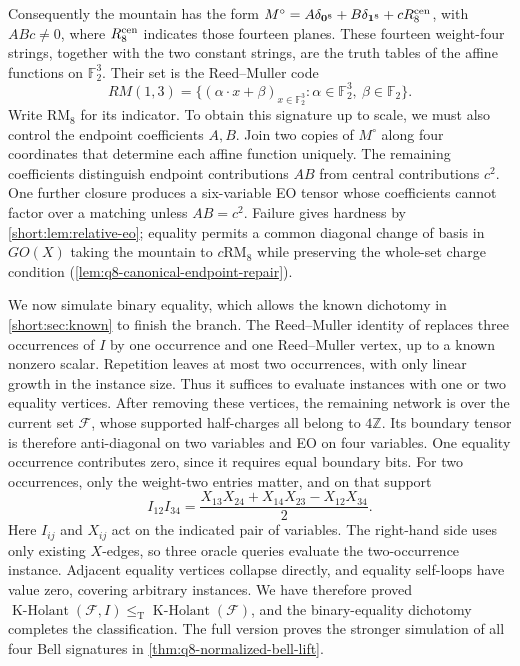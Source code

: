 \documentclass[11pt,letterpaper,onecolumn]{article}
\theoremstyle{plain}
\theoremstyle{definition}
\theoremstyle{remark}
\newcommand{\cF}{\mathcal F}
\newcommand{\KHolant}{\operatorname{K\text{-}Holant}}
\newcommand{\one}{\mathbf 1}
\newcommand{\zero}{\mathbf 0}
\newcommand{\RMcore}{\mathrm{RM}_8}
\newcommand{\leT}{\leq_{\mathrm T}}
\begin{document}
Consequently the mountain has the form
\(M^\circ=A\delta_{\zero^8}+B\delta_{\one^8}+cR_8^{\rm cen}\), with
\(ABc\ne0\), where \(R_8^{\rm cen}\) indicates those fourteen planes.
These fourteen weight-four strings, together with the two constant
strings, are the truth tables of the affine functions on \(\mathbb F_2^3\).
Their set is the Reed--Muller code
\[
RM(1,3)=\{(\alpha\cdot x+\beta)_{x\in\mathbb F_2^3}:
\alpha\in\mathbb F_2^3,\ \beta\in\mathbb F_2\}.
\]
Write \(\RMcore\) for its indicator. To obtain this signature up to
scale, we must also control the endpoint coefficients \(A,B\).
Join two copies of \(M^\circ\) along four coordinates that determine
each affine function uniquely. The remaining coefficients distinguish
endpoint contributions \(AB\) from central contributions \(c^2\).
One further closure produces a six-variable EO tensor whose coefficients
cannot factor over a matching unless \(AB=c^2\). Failure gives hardness
by \cref{short:lem:relative-eo}; equality permits a common diagonal
change of basis in \(GO(X)\) taking the mountain to \(c\RMcore\)
while preserving the whole-set charge condition (\cref{lem:q8-canonical-endpoint-repair}).

We now simulate binary equality, which allows the known dichotomy in
\cref{short:sec:known} to finish the branch. The Reed--Muller identity of
\cite[full version, Lemma~8.9]{ShaoCai2020} replaces three occurrences
of \(I\) by one occurrence and one Reed--Muller vertex, up to a known
nonzero scalar. Repetition leaves at most two occurrences, with only
linear growth in the instance size. Thus it suffices to evaluate
instances with one or two equality vertices. After removing these
vertices, the remaining network is over the current set \(\cF\), whose
supported half-charges all belong to \(4\mathbb Z\). Its boundary tensor
is therefore anti-diagonal on two variables and EO on four variables.
One equality occurrence contributes zero, since it requires equal
boundary bits. For two occurrences, only the weight-two entries matter,
and on that support
\[
I_{12}I_{34}
=\frac{X_{13}X_{24}+X_{14}X_{23}-X_{12}X_{34}}2.
\]
Here \(I_{ij}\) and \(X_{ij}\) act on the indicated pair of variables.
The right-hand side uses only existing \(X\)-edges, so three oracle
queries evaluate the two-occurrence instance. Adjacent equality vertices
collapse directly, and equality self-loops have value zero, covering
arbitrary instances. We have therefore proved
\(\KHolant(\cF,I)\leT\KHolant(\cF)\), and the binary-equality
dichotomy completes the classification. The full version proves the
stronger simulation of all four Bell signatures in
\cref{thm:q8-normalized-bell-lift}.
\end{document}
